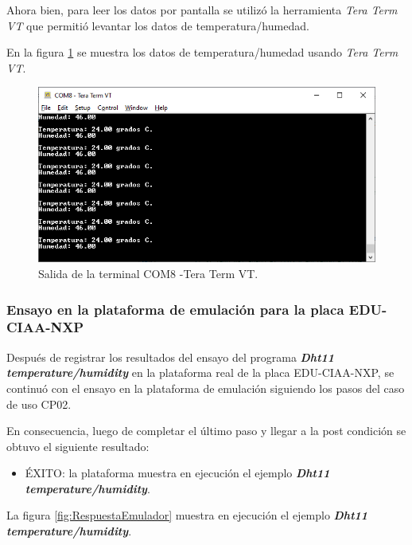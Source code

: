 Ahora bien, para leer los datos por pantalla se utilizó la herramienta \textit{Tera Term VT} que permitió levantar los datos de temperatura/humedad.

En la figura \ref{fig:TestTerminal} se muestra los datos de temperatura/humedad usando \textit{Tera Term VT}. 


\begin{figure}[ht]
	\centering
	\includegraphics[scale=.59]{./Figures/TestTerminal.png}
	\caption{Salida de la terminal COM8 -Tera Term VT.}
	\label{fig:TestTerminal}
\end{figure}

\subsubsection{Ensayo en la plataforma de emulación para la placa EDU-CIAA-NXP} 

Después de registrar los resultados del ensayo del programa \textit{\textbf{Dht11 temperature/humidity}} en la plataforma real de la placa EDU-CIAA-NXP, se continuó con el ensayo en la plataforma de emulación siguiendo los pasos del caso de uso CP02.

En consecuencia, luego de completar el último paso y llegar a la post condición se obtuvo el siguiente resultado: 

\begin{itemize}
	\item ÉXITO: la plataforma muestra en ejecución el ejemplo \textit{\textbf{Dht11 temperature/humidity}}.
\end{itemize}

La figura \ref{fig:RespuestaEmulador} muestra en ejecución el ejemplo \textit{\textbf{Dht11 temperature/humidity}}.


